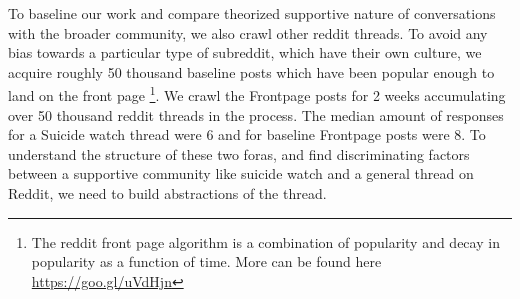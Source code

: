 To baseline our work and compare theorized supportive nature of conversations with the broader community, we also crawl other reddit threads. To avoid any bias towards a particular type of subreddit, which have their own culture, we acquire roughly 50 thousand baseline posts which have been popular enough to land on the front page \footnote{The reddit front page algorithm is a combination of popularity and decay in popularity as a function of time. More can be found here \url{https://goo.gl/uVdHjn}}. We crawl the Frontpage posts for 2 weeks accumulating over 50 thousand reddit threads in the process. The median amount of responses for a Suicide watch thread were 6 and for baseline Frontpage posts were 8. 
To understand the structure of these two foras, and find discriminating factors between a supportive community like suicide watch and a general thread on Reddit, we need to build abstractions of the thread. 



%


